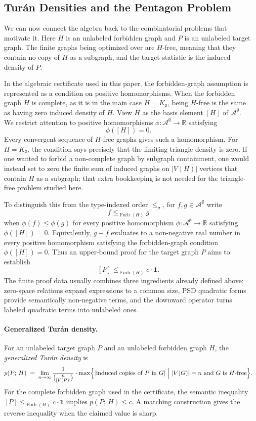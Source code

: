 \documentclass{article}
\newcommand{\tdensity}[2]{p(#1;\,#2)}
\newcommand{\forbLE}[1]{\leq_{\operatorname{Forb}(#1)}}
\begin{document}
\subsection{Turán Densities and the Pentagon Problem}

We can now connect the algebra back to the combinatorial problems that motivate
it.  Here $H$ is an unlabeled forbidden graph and $P$ is an unlabeled target
graph.  The finite graphs being optimized over are $H$-free, meaning that they
contain no copy of $H$ as a subgraph, and the target statistic is the induced
density of $P$.

In the algebraic certificate used in this paper, the forbidden-graph
assumption is represented as a condition on positive homomorphisms.  When the
forbidden graph $H$ is complete, as it is in the main case $H=K_3$, being
$H$-free is the same as having zero induced density of $H$.  View $H$ as the
basis element $[H]$ of $\mathcal{A}^\emptyset$.  We restrict attention to
positive homomorphisms $\phi:\mathcal{A}^\emptyset\to\mathbb{R}$ satisfying
\[
  \phi([H])=0.
\]
Every convergent sequence of $H$-free graphs gives such a homomorphism.  For
$H=K_3$, the condition says precisely that the limiting triangle density is
zero.  If one wanted to forbid a non-complete graph by subgraph containment,
one would instead set to zero the finite sum of induced graphs on $|V(H)|$
vertices that contain $H$ as a subgraph; that extra bookkeeping is not needed
for the triangle-free problem studied here.

To distinguish this from the type-indexed order $\leq_\sigma$, for
$f,g\in\mathcal{A}^\emptyset$ write
\[
  f \forbLE{H} g
\]
when $\phi(f)\leq\phi(g)$ for every positive homomorphism
$\phi:\mathcal{A}^\emptyset\to\mathbb{R}$ satisfying
$\phi([H])=0$.  Equivalently, $g-f$ evaluates to a non-negative real number in
every positive homomorphism satisfying the forbidden-graph condition
$\phi([H])=0$.
Thus an upper-bound proof for the target graph $P$ aims to establish
\[
  [P] \forbLE{H} c\cdot\mathbf{1}.
\]
The finite proof data usually combines three ingredients already defined
above: zero-space relations expand expressions to a common size, PSD quadratic
forms provide semantically non-negative terms, and the downward operator turns
labeled quadratic terms into unlabeled ones.

\paragraph{Generalized Turán density.}
For an unlabeled target graph $P$ and an unlabeled forbidden graph $H$, the
\emph{generalized Turán density} is
\[
  \tdensity{P}{H}
  \;=\;
  \lim_{n\to\infty}
  \frac{1}{\binom{n}{|V(P)|}} \cdot
    {\max\Bigl\{|\text{induced copies of }P\text{ in }G|
                   ~\Big|~ |V(G)|=n \text{ and } G \text{ is }H\text{-free}\Bigr\}}.
\]
For the complete forbidden graph used in the certificate, the semantic
inequality $[P] \forbLE{H} c\cdot\mathbf{1}$ implies
$\tdensity{P}{H}\leq c$.  A matching construction gives the reverse
inequality when the claimed value is sharp.
\end{document}
